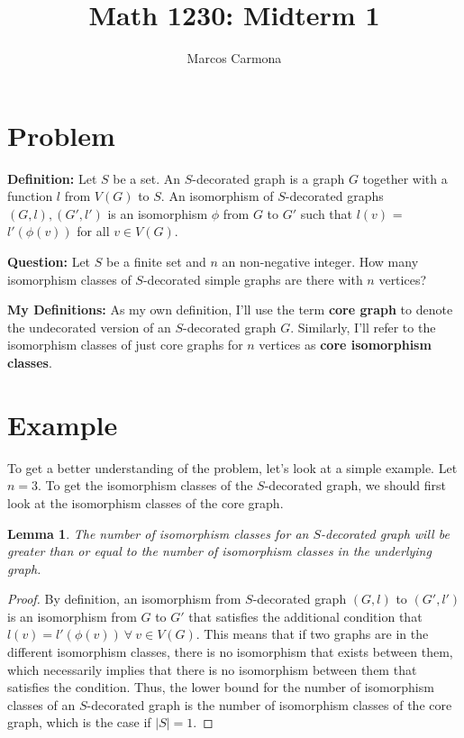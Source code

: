 \documentclass[11pt,reqno]{amsart}
\title{Math 1230: Midterm 1}
\author[M. Carmona]{Marcos Carmona}
\newtheorem{lemma}[theorem]{Lemma}
\theoremstyle{definition}
\begin{document}
\maketitle
\setcounter{tocdepth}{1}

\section{Problem}
\textbf{Definition:}
    Let $S$ be a set. An $S$-decorated graph is a graph $G$ together with a function $l$ from $V(G)$ to $S$. An isomorphism of $S$-decorated graphs $(G, l), (G', l')$ is an isomorphism $\phi$ from $G$ to $G'$ such that $l(v)$ = $l'(\phi(v))$ for all $v \in V(G)$.

\textbf{Question:}
Let $S$ be a finite set and $n$ an non-negative integer. How many
isomorphism classes of $S$-decorated simple graphs are there with $n$ vertices?

\textbf{My Definitions:}
As my own definition, I'll use the term \textbf{core graph} to denote the undecorated version of an $S$-decorated graph $G$. Similarly, I'll refer to the isomorphism classes of just core graphs for $n$ vertices as \textbf{core isomorphism classes}. 

\section{Example}
\label{sec:Example}

To get a better understanding of the problem, let's look at a simple example. Let $n = 3$. To get the isomorphism classes of the $S$-decorated graph, we should first look at the isomorphism classes of the core graph. 

\begin{lemma}
    The number of isomorphism classes for an $S$-decorated graph will be greater than or equal to the number of isomorphism classes in the underlying graph.
\end{lemma}

\begin{proof}
    By definition, an isomorphism from $S$-decorated graph $(G, l)$ to $(G', l')$ is an isomorphism from $G$ to $G'$ that satisfies the additional condition that $l(v) = l'(\phi(v)) \: \forall \: v \in V(G)$. This means that if two graphs are in the different isomorphism classes, there is no isomorphism that exists between them, which necessarily implies that there is no isomorphism between them that satisfies the condition. Thus, the lower bound for the number of isomorphism classes of an $S$-decorated graph is the number of isomorphism classes of the core graph, which is the case if $\mid S \mid = 1$.
\end{proof}
\end{document}
